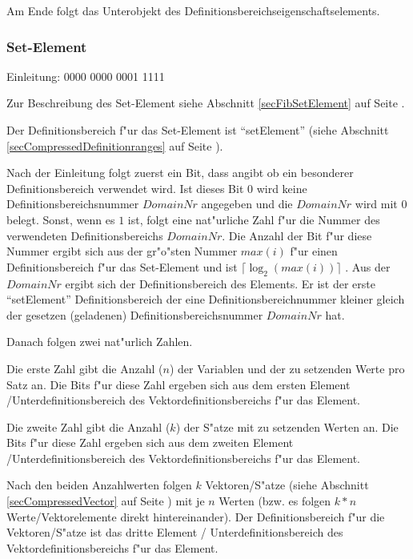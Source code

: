 Am Ende folgt das Unterobjekt des Definitionsbereichseigenschaftselements.



\subsubsection{Set-Element}
\label{secCompressedFibSet}

Einleitung: 0000 0000 0001 1111

\bigskip\noindent
Zur Beschreibung des Set-Element siehe Abschnitt \ref{secFibSetElement} auf Seite \pageref{secFibSetElement} .

Der Definitionsbereich f"ur das Set-Element ist ``setElement'' (siehe Abschnitt \ref{secCompressedDefinitionranges} auf Seite \pageref{secCompressedDefinitionranges}).

Nach der Einleitung folgt zuerst ein Bit, dass angibt ob ein besonderer Definitionsbereich verwendet wird. Ist dieses Bit $0$ wird keine Definitionsbereichsnummer $DomainNr$ angegeben und die $DomainNr$ wird mit 0 belegt. Sonst, wenn es $1$ ist, folgt eine nat"urliche Zahl f"ur die Nummer des verwendeten Definitionsbereichs $DomainNr$. Die Anzahl der Bit f"ur diese Nummer ergibt sich aus der gr"o"sten Nummer $max(i)$ f"ur einen Definitionsbereich f"ur das Set-Element und ist $\lceil \log_2( max(i) ) \rceil$ .
Aus der $DomainNr$ ergibt sich der Definitionsbereich des Elements. Er ist der erste ``setElement'' Definitionsbereich der eine Definitionsbereichnummer kleiner gleich der gesetzen (geladenen) Definitionsbereichsnummer $DomainNr$ hat.

Danach folgen zwei nat"urlich Zahlen.

Die erste Zahl gibt die Anzahl ($n$) der Variablen und der zu setzenden Werte pro Satz an. Die Bits f"ur diese Zahl ergeben sich aus dem ersten Element /Unterdefinitionsbereich des Vektordefinitionsbereichs f"ur das Element.

Die zweite Zahl gibt die Anzahl ($k$) der S"atze mit zu setzenden Werten an. Die Bits f"ur diese Zahl ergeben sich aus dem zweiten Element /Unterdefinitionsbereich des Vektordefinitionsbereichs f"ur das Element.

Nach den beiden Anzahlwerten folgen $k$ Vektoren/S"atze (siehe Abschnitt \ref{secCompressedVector} auf Seite \pageref{secCompressedVector}) mit je $n$ Werten (bzw. es folgen $k * n$ Werte/Vektorelemente direkt hintereinander). Der Definitionsbereich f"ur die Vektoren/S"atze ist das dritte Element / Unterdefinitionsbereich des Vektordefinitionsbereichs f"ur das Element.

